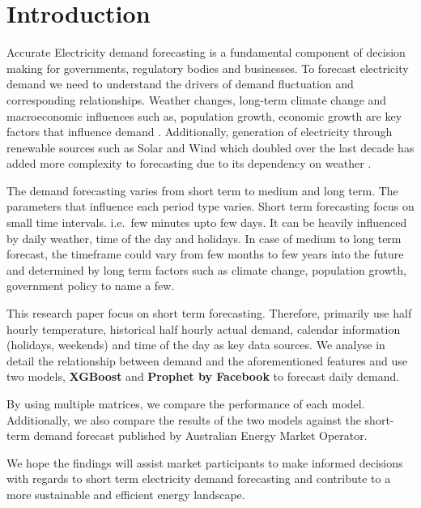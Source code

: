 \documentclass[mstat,12pt]{unswthesis}
\begin{document}



\chapter{Introduction}\label{introduction}

Accurate Electricity demand forecasting is a fundamental component of
decision making for governments, regulatory bodies and businesses. To
forecast electricity demand we need to understand the drivers of demand
fluctuation and corresponding relationships. Weather changes, long-term
climate change and macroeconomic influences such as, population growth,
economic growth are key factors that influence demand \cite{a2024_nem}.
Additionally, generation of electricity through renewable sources such
as Solar and Wind which doubled over the last decade has added more
complexity to forecasting due to its dependency on weather
\cite{energygovau_2024_renewables}.

The demand forecasting varies from short term to medium and long term.
The parameters that influence each period type varies. Short term
forecasting focus on small time intervals. i.e.~few minutes upto few
days. It can be heavily influenced by daily weather, time of the day and
holidays. In case of medium to long term forecast, the timeframe could
vary from few months to few years into the future and determined by long
term factors such as climate change, population growth, government
policy to name a few.

This research paper focus on short term forecasting. Therefore,
primarily use half hourly temperature, historical half hourly actual
demand, calendar information (holidays, weekends) and time of the day as
key data sources. We analyse in detail the relationship between demand
and the aforementioned features and use two models, \textbf{XGBoost} and
\textbf{Prophet by Facebook} to forecast daily demand.

By using multiple matrices, we compare the performance of each model.
Additionally, we also compare the results of the two models against the
short-term demand forecast published by Australian Energy Market
Operator.

We hope the findings will assist market participants to make informed
decisions with regards to short term electricity demand forecasting and
contribute to a more sustainable and efficient energy landscape.

\bigskip
\end{document}
